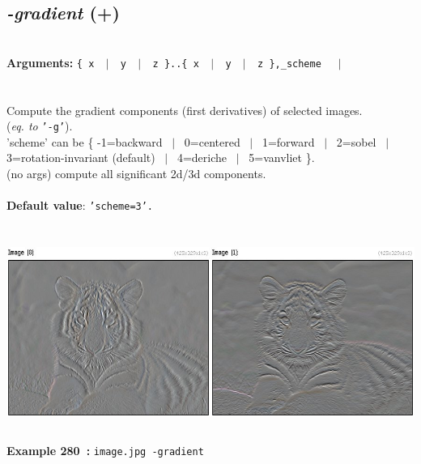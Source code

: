 \documentclass[a4paper,11pt,twoside]{book}
\begin{document}
\subsection{\emph{-gradient} (+)}\vspace*{-0.5em}
~\\\textbf{Arguments: } 
{\small \texttt{\{ x ~$|$~ y ~$|$~ z \}..\{ x ~$|$~ y ~$|$~ z \},\_scheme}}~~~$|$\\
\\~\\
Compute the gradient components (first derivatives) of selected images.
~\\(\emph{eq. to} {\small \texttt{'-g'}}).
~\\'scheme' can be \{ -1=backward ~$|$~ 0=centered ~$|$~ 1=forward ~$|$~ 2=sobel ~$|$~ 3=rotation-invariant (default) ~$|$~ 4=deriche ~$|$~ 5=vanvliet \}.
~\\(no args) compute all significant 2d/3d components.
~\\~\\\textbf{Default value}: {\small \texttt{'scheme=3'.}}
\begin{center}\includegraphics[keepaspectratio=true,height=7cm,width=\textwidth]{img/gmic_def280.jpg}\\
{\footnotesize \textbf{Example 280~:} \texttt{image.jpg -gradient}}
\end{center}
\end{document}

